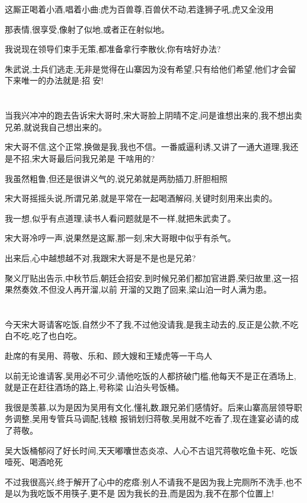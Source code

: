 ﻿\documentclass[12pt]{article}
\begin{document}
这厮正喝着小酒,唱着小曲:虎为百兽尊,百兽伏不动,若逢狮子吼,虎又全没用\dldots

那表情,很享受,像射了似地,或者正在射似地。

我说现在领导们束手无策,都准备拿行李散伙,你有啥好办法?

朱武说,士兵们逃走,无非是觉得在山寨因为没有希望,只有给他们希望,他们才会留下来\dldots 唯一的办法就是:招
安! 

\section{}

当我兴冲冲的跑去告诉宋大哥时,宋大哥脸上阴晴不定,问是谁想出来的,我不想出卖兄弟,就说我自己想出来的。

宋大哥不信,这个正常,换做是我,我也不信。一番威逼利诱,又讲了一通大道理,我还是不招,宋大哥最后问我兄弟是
干啥用的?

我虽然粗鲁,但还是很讲义气的,说兄弟就是两肋插刀,肝胆相照

宋大哥摇摇头说,所谓兄弟,就是平常在一起喝酒解闷,关键时刻用来出卖的。

我一想,似乎有点道理,读书人看问题就是不一样,就把朱武卖了。

宋大哥冷哼一声,说果然是这厮,那一刻,宋大哥眼中似乎有杀气。

出来后,心中越想越不对,我跟宋大哥是不是也是兄弟?\dldots

聚义厅贴出告示,中秋节后,朝廷会招安,到时候兄弟们都加官进爵,荣归故里,这一招果然奏效,不但没人再开溜,以前
开溜的又跑了回来,梁山泊一时人满为患。

\section{}

今天宋大哥请客吃饭,自然少不了我,不过他没请我,是我主动去的,反正是公款,不吃白不吃,吃了也白吃。

赴席的有吴用、蒋敬、乐和、顾大嫂和王矮虎等一干鸟人

以前无论谁请客,吴用必不可少,请他吃饭的人都挤破门槛,他每天不是正在酒场上,就是正在赶往酒场的路上,号称梁
山泊头号饭桶。

我很是羡慕,以为是因为吴用有文化,懂礼数,跟兄弟们感情好。后来山寨高层领导职务调整,吴用专管兵马调配,钱粮
报销划归蒋敬,吴用就不吃香了,现在逢宴必请的成了蒋敬。

吴大饭桶郁闷了好长时间,天天嘟囔世态炎凉、人心不古\dldots 诅咒蒋敬吃鱼卡死、吃饭噎死、喝酒呛死\dldots

不过我很高兴,终于解开了心中的疙瘩:别人不请我不是因为我上完厕所不洗手,也不是以为我吃饭不用筷子,更不是
因为我长的丑,而是因为,我不在那个位置上!
\end{document}
